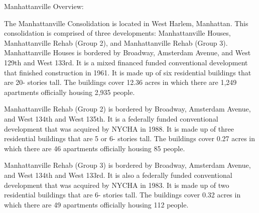 Manhattanville Overview:   

 

The Manhattanville Consolidation is located in West Harlem, Manhattan. This consolidation is comprised of three developments: Manhattanville Houses, Manhattanville Rehab (Group 2), and Manhattanville Rehab (Group 3). Manhattanville Houses is bordered by Broadway, Amsterdam Avenue, and West 129th and West 133rd. It is a mixed financed funded conventional development that finished construction in 1961. It is made up of six residential buildings that are 20- stories tall. The buildings cover 12.36 acres in which there are 1,249 apartments officially housing 2,935 people.    

   

Manhattanville Rehab (Group 2) is bordered by Broadway, Amsterdam Avenue, and West 134th and West 135th. It is a federally funded conventional development that was acquired by NYCHA in 1988. It is made up of three residential buildings that are 5 or 6- stories tall. The buildings cover 0.27 acres in which there are 46 apartments officially housing 85 people.    

Manhattanville Rehab (Group 3) is bordered by Broadway, Amsterdam Avenue, and West 134th and West 133rd. It is also a federally funded conventional development that was acquired by NYCHA in 1983. It is made up of two residential buildings that are 6- stories tall. The buildings cover 0.32 acres in which there are 49 apartments officially housing 112 people.        